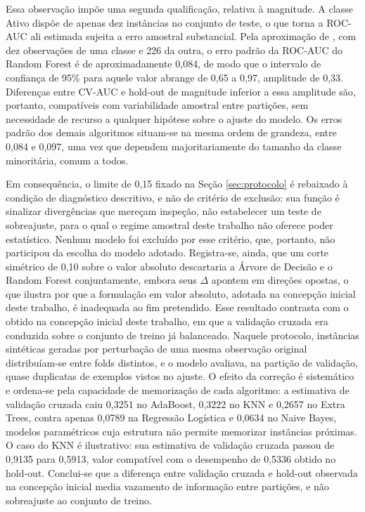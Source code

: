 Essa observação impõe uma segunda qualificação, relativa à magnitude. A classe Ativo dispõe de apenas dez instâncias no conjunto de teste, o que torna a ROC-AUC ali estimada sujeita a erro amostral substancial. Pela aproximação de , com dez observações de uma classe e 226 da outra, o erro padrão da ROC-AUC do Random Forest é de aproximadamente 0,084, de modo que o intervalo de confiança de 95\% para aquele valor abrange de 0,65 a 0,97, amplitude de 0,33. Diferenças entre CV-AUC e hold-out de magnitude inferior a essa amplitude são, portanto, compatíveis com variabilidade amostral entre partições, sem necessidade de recurso a qualquer hipótese sobre o ajuste do modelo. Os erros padrão dos demais algoritmos situam-se na mesma ordem de grandeza, entre 0,084 e 0,097, uma vez que dependem majoritariamente do tamanho da classe minoritária, comum a todos.

Em consequência, o limite de 0,15 fixado na Seção \ref{sec:protocolo} é rebaixado à condição de diagnóstico descritivo, e não de critério de exclusão: sua função é sinalizar divergências que mereçam inspeção, não estabelecer um teste de sobreajuste, para o qual o regime amostral deste trabalho não oferece poder estatístico. Nenhum modelo foi excluído por esse critério, que, portanto, não participou da escolha do modelo adotado. Registra-se, ainda, que um corte simétrico de 0,10 sobre o valor absoluto descartaria a Árvore de Decisão e o Random Forest conjuntamente, embora seus $\Delta$ apontem em direções opostas, o que ilustra por que a formulação em valor absoluto, adotada na concepção inicial deste trabalho, é inadequada ao fim pretendido. Esse resultado contrasta com o obtido na concepção inicial deste trabalho, em que a validação cruzada era conduzida sobre o conjunto de treino já balanceado. Naquele protocolo, instâncias sintéticas geradas por perturbação de uma mesma observação original distribuíam-se entre folds distintos, e o modelo avaliava, na partição de validação, quase duplicatas de exemplos vistos no ajuste. O efeito da correção é sistemático e ordena-se pela capacidade de memorização de cada algoritmo: a estimativa de validação cruzada caiu 0,3251 no AdaBoost, 0,3222 no KNN e 0,2657 no Extra Trees, contra apenas 0,0789 na Regressão Logística e 0,0634 no Naive Bayes, modelos paramétricos cuja estrutura não permite memorizar instâncias próximas. O caso do KNN é ilustrativo: sua estimativa de validação cruzada passou de 0,9135 para 0,5913, valor compatível com o desempenho de 0,5336 obtido no hold-out. Conclui-se que a diferença entre validação cruzada e hold-out observada na concepção inicial media vazamento de informação entre partições, e não sobreajuste ao conjunto de treino.

